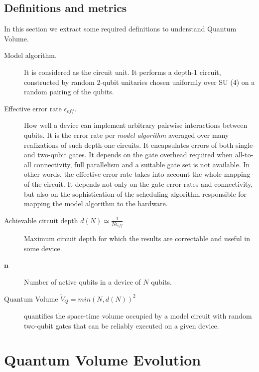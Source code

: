 \documentclass[11pt]{article}
\begin{document}
\subsection{Definitions and metrics}
\label{sec:orgcf2711a}

In this section we extract some required definitions \cite{Bishop_2017,Moll_2018} to understand Quantum Volume. 


\begin{description}
\item[{Model algorithm.}] It is considered as the circuit unit. It performs a depth-1 circuit, constructed by random 2-qubit unitaries chosen uniformly over SU (4) on a random pairing of the qubits.

\item[{Effective error rate \(\epsilon_{eff}\).}] How well a device can implement arbitrary pairwise interactions between qubits. It is the error rate per \emph{model algorithm} averaged over many realizations of such depth-one circuits. It encapsulates errors of both single- and two-qubit gates. It depends on the gate overhead required when all-to-all connectivity, full parallelism and a suitable gate set is not available. In other words, the effective error rate takes into account the whole mapping of the circuit. It depends not only on the gate error rates and connectivity, but also on the sophistication of the scheduling algorithm responsible for mapping the model algorithm to the hardware.

\item[{Achievable circuit depth \(d(N) \simeq \frac{1}{N \epsilon_{eff}}\)}] Maximum circuit depth for which the results are correctable and useful in some device.
\end{description}

\begin{description}
\item[{\(\textbf{n}\)}] Number of active qubits in a device of \(N\) qubits.

\item[{Quantum Volume \(\tilde{V}_Q = min (N, d(N))^2\)}] quantifies the space-time volume occupied by a model circuit with random two-qubit gates that can be reliably executed on a given device.
\end{description}

\section{Quantum Volume Evolution}
\label{sec:org845b613}
\end{document}
